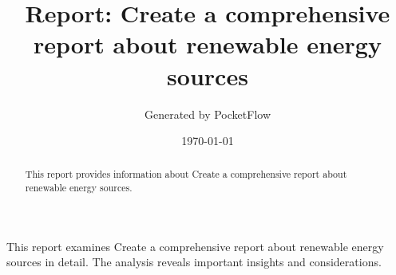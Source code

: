 \documentclass[11pt,a4paper]{article}
\begin{document}
\title{Report: Create a comprehensive report about renewable energy sources}
\author{Generated by PocketFlow}
\date{\today}

\maketitle

\begin{abstract}
This report provides information about Create a comprehensive report about renewable energy sources.
\end{abstract}

\tableofcontents
\newpage

This report examines Create a comprehensive report about renewable energy sources in detail. The analysis reveals important insights and considerations.
\end{document}
